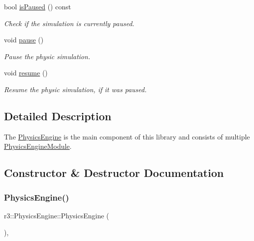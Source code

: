 \begin{DoxyCompactItemize}
bool \mbox{\hyperlink{classr3_1_1_physics_engine_a8978c7f4626cb0c69a79456c304323d2}{is\+Paused}} () const
\begin{DoxyCompactList}\small\item\em Check if the simulation is currently paused. \end{DoxyCompactList}\item 
void \mbox{\hyperlink{classr3_1_1_physics_engine_a6ed605620a6f115f014d3940dc2a5487}{pause}} ()
\begin{DoxyCompactList}\small\item\em Pause the physic simulation. \end{DoxyCompactList}\item 
void \mbox{\hyperlink{classr3_1_1_physics_engine_a149087534c28ba2d5118a2b6d652491c}{resume}} ()
\begin{DoxyCompactList}\small\item\em Resume the physic simulation, if it was paused. \end{DoxyCompactList}\end{DoxyCompactItemize}


\subsection{Detailed Description}
The \mbox{\hyperlink{classr3_1_1_physics_engine}{Physics\+Engine}} is the main component of this library and consists of multiple \mbox{\hyperlink{classr3_1_1_physics_engine_module}{Physics\+Engine\+Module}}. 

\subsection{Constructor \& Destructor Documentation}
\mbox{\label{classr3_1_1_physics_engine_a15ef3c7b786475bec9e2afb24d48ffea}} 
\subsubsection{\texorpdfstring{Physics\+Engine()}{PhysicsEngine()}}
{\footnotesize\ttfamily r3\+::\+Physics\+Engine\+::\+Physics\+Engine (\begin{DoxyParamCaption}{ }\end{DoxyParamCaption})\hspace{0.3cm}{\ttfamily [explicit]}, {\ttfamily [default]}}

